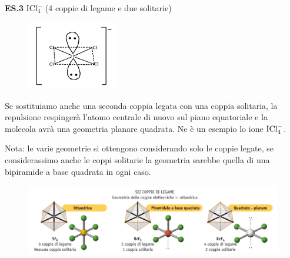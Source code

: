 \vspace{0.2cm}\textbf{ES.3} ICl$_4^-$ (4 coppie di legame e due solitarie)

\hspace{0.5cm}\begin{minipage}{0.2\textwidth}
    \begin{figure}[H]
    \includegraphics[width=4cm]{immagini/ICl_4.png}
    \end{figure}
    \end{minipage} \hfill
    \begin{minipage}{0.65\textwidth}
        \vspace{0.2cm}Se sostituiamo anche una seconda coppia legata con una coppia solitaria, la repulsione respingerà l'atomo centrale di nuovo sul piano equatoriale e la molecola avrà una geometria planare quadrata. Ne è un esempio lo ione $\rm ICl_4^-$.
    \end{minipage}

\vspace{0.2cm}Nota: le varie geometrie si ottengono considerando solo le coppie legate, se considerassimo anche le coppi solitarie la geometria sarebbe quella di una bipiramide a base quadrata in ogni caso.

\begin{figure}[htp]
    \centering
    \includegraphics[width=14cm]{immagini/geometrie-6-coppie.png}
\end{figure}